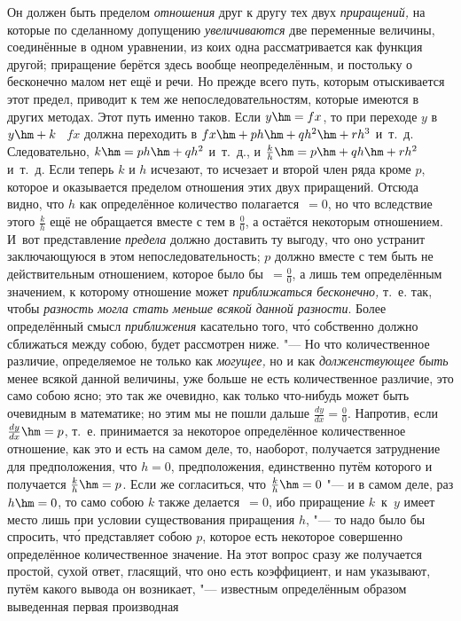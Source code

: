 Он должен быть пределом {\em отношения} друг к другу тех двух {\em приращений,}
на которые по сделанному допущению {\em увеличиваются} две переменные величины,
соединённые в одном уравнении, из коих одна рассматривается как функция другой;
приращение берётся здесь вообще неопределённым, и постольку о бесконечно малом
нет ещё и речи. Но прежде всего путь, которым отыскивается этот предел,
приводит к тем же непоследовательностям, которые имеются в других методах. Этот
путь именно таков. Если $y\hm=fx$, то при переходе $y$ в $y\hm+k$ \  $fx$
должна переходить в $fx\hm+ph\hm+qh^2\hm+rh^3$ и~т.~д. Следовательно,
$k\hm=ph\hm+qh^2$ и~т.~д., и $\frac k h\hm=p\hm+qh\hm+rh^2$ и~т.~д. Если теперь
$k$ и $h$ исчезают, то исчезает и второй член ряда кроме $p$, которое и
оказывается пределом отношения этих двух приращений. Отсюда видно, что $h$ как
определённое количество полагается~$=0$, но что вследствие этого $\frac k h$
ещё не обращается вместе с тем в $\frac 0 0$, а остаётся некоторым отношением.
И~вот представление {\em предела} должно доставить ту выгоду, что оно устранит
заключающуюся в этом непоследовательность; $p$ должно вместе с тем быть не
действительным отношением, которое было бы~$=\frac 0 0$, а лишь тем
определённым значением, к которому отношение может
{\em приближаться бесконечно,} т.~е. так, чтобы {\em разность могла стать
меньше всякой данной разности}. Более определённый смысл {\em приближения}
касательно того, чт\'{о} собственно должно сближаться между собою, будет рассмотрен
ниже. "--- Но что количественное различие, определяемое не только как
{\em могущее,} но и как {\em долженствующее быть} менее всякой данной величины,
уже больше не есть количественное различие, это само собою ясно; это так же
очевидно, как только что-нибудь может быть очевидным в математике; но этим мы
не пошли дальше $\frac{dy}{dx}=\frac 0 0$. Напротив, если $\frac{dy}{dx}\hm=p$,
т.~е. принимается за некоторое определённое количественное отношение, как это и
есть на самом деле, то, наоборот, получается затруднение для предположения, что
$h=0$, предположения, единственно путём которого и получается $\frac k h\hm=p$.
Если же согласиться, что $\frac k h\hm=0$ "--- и в самом деле, раз $h\hm=0$, то
само собою $k$ также делается~$=0$, ибо приращение $k$~к~$y$ имеет место лишь
при условии существования приращения $h$, "--- то надо было бы спросить,
чт\'{о} представляет собою $p$, которое есть некоторое совершенно определённое
количественное значение. На этот вопрос сразу же получается простой, сухой
ответ, гласящий, что оно есть коэффициент, и нам указывают, путём какого вывода
он возникает, "--- известным определённым образом выведенная первая производная
